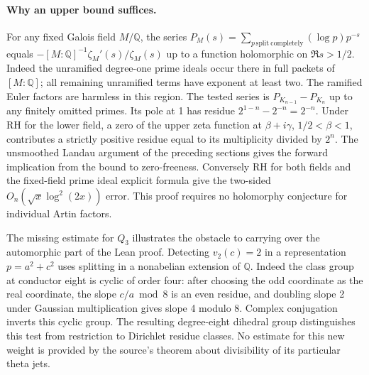 \paragraph{Why an upper bound suffices.}
For any fixed Galois field $M/\mathbb Q$, the series
$P_M(s)=\sum_{p\,\mathrm{split\ completely}}(\log p)p^{-s}$
equals $-[M:\mathbb Q]^{-1}\zeta_M'(s)/\zeta_M(s)$ up to a function
holomorphic on $\Re s>1/2$. Indeed the unramified degree-one prime
ideals occur there in full packets of $[M:\mathbb Q]$; all remaining
unramified terms have exponent at least two. The ramified Euler factors
are harmless in this region. The tested series is $P_{K_{n-1}}-P_{K_n}$
up to any finitely omitted primes. Its pole at 1 has residue
$2^{1-n}-2^{-n}=2^{-n}$. Under RH for the lower field, a zero of
the upper zeta function at $\beta+i\gamma$, $1/2<\beta<1$, contributes
a strictly positive residue equal to its multiplicity divided by $2^n$.
The unsmoothed Landau argument of the preceding sections gives the forward
implication from the bound to zero-freeness. Conversely RH for both
fields and the fixed-field prime ideal explicit formula give the
two-sided $O_n(\sqrt x\log^2(2x))$ error. This proof requires no
holomorphy conjecture for individual Artin factors.

The missing estimate for $Q_3$ illustrates the obstacle to carrying
over the automorphic part of the Lean proof. Detecting $v_2(c)=2$
in a representation $p=a^2+c^2$ uses splitting in a nonabelian
extension of $\mathbb Q$. Indeed the class group at conductor eight
is cyclic of order four: after choosing the odd coordinate as the real
coordinate, the slope $c/a\bmod8$ is an even residue, and doubling slope
2 under Gaussian multiplication gives slope 4 modulo 8. Complex
conjugation inverts this cyclic group. The resulting degree-eight
dihedral group distinguishes this test from restriction to
Dirichlet residue classes. No estimate for this new weight is provided
by the source's theorem about divisibility of its particular theta jets.
